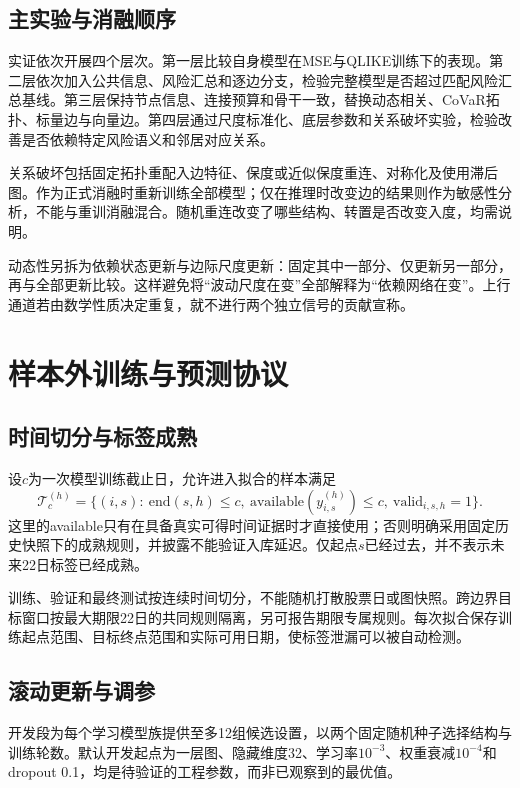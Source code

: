 \subsection{主实验与消融顺序}
实证依次开展四个层次。第一层比较自身模型在MSE与QLIKE训练下的表现。第二层依次加入公共信息、风险汇总和逐边分支，检验完整模型是否超过匹配风险汇总基线。第三层保持节点信息、连接预算和骨干一致，替换动态相关、CoVaR拓扑、标量边与向量边。第四层通过尺度标准化、底层参数和关系破坏实验，检验改善是否依赖特定风险语义和邻居对应关系。

关系破坏包括固定拓扑重配入边特征、保度或近似保度重连、对称化及使用滞后图。作为正式消融时重新训练全部模型；仅在推理时改变边的结果则作为敏感性分析，不能与重训消融混合。随机重连改变了哪些结构、转置是否改变入度，均需说明。

动态性另拆为依赖状态更新与边际尺度更新：固定其中一部分、仅更新另一部分，再与全部更新比较。这样避免将“波动尺度在变”全部解释为“依赖网络在变”。上行通道若由数学性质决定重复，就不进行两个独立信号的贡献宣称。

\section{样本外训练与预测协议}
\subsection{时间切分与标签成熟}
设$c$为一次模型训练截止日，允许进入拟合的样本满足
\begin{equation}\label{eq:training_set}
\mathcal T_c^{(h)}=\{(i,s):\ \mathrm{end}(s,h)\leq c,
\ \mathrm{available}(y_{i,s}^{(h)})\leq c,\ \mathrm{valid}_{i,s,h}=1\}.
\end{equation}
这里的available只有在具备真实可得时间证据时才直接使用；否则明确采用固定历史快照下的成熟规则，并披露不能验证入库延迟。仅起点$s$已经过去，并不表示未来22日标签已经成熟。

训练、验证和最终测试按连续时间切分，不能随机打散股票日或图快照。跨边界目标窗口按最大期限22日的共同规则隔离，另可报告期限专属规则。每次拟合保存训练起点范围、目标终点范围和实际可用日期，使标签泄漏可以被自动检测。

\subsection{滚动更新与调参}
开发段为每个学习模型族提供至多12组候选设置，以两个固定随机种子选择结构与训练轮数。默认开发起点为一层图、隐藏维度32、学习率$10^{-3}$、权重衰减$10^{-4}$和dropout 0.1，均是待验证的工程参数，而非已观察到的最优值。

